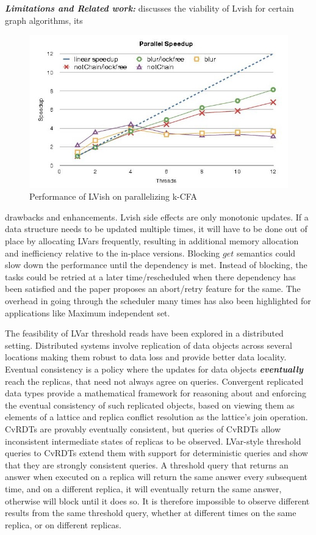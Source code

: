 \documentclass[twocolumn]{article}
\begin{document}
\textbf{\textit{Limitations and Related work:}} \cite{newton1}discusses the viability of Lvish for certain graph algorithms, its
\begin{figure}
\centerline{
\includegraphics[width=1.0\columnwidth]{Figures/speedup.jpg}
}
\caption{Performance of LVish on parallelizing k-CFA\cite{lkuper2}}
\label{Figure2}
\end{figure}
drawbacks and enhancements. Lvish side effects are only monotonic updates. If a data structure needs to be updated multiple times, it will have to be done out of place by allocating LVars frequently, resulting in additional memory allocation and inefficiency relative to the in-place versions. Blocking $get$ semantics could slow down the performance until the dependency is met. Instead of blocking, the tasks could be retried at a later time/rescheduled when there dependency has been satisfied and the paper proposes an abort/retry feature for the same. The overhead in going through the scheduler many times has also been highlighted for applications like Maximum independent set.\\ \par
The feasibility of LVar threshold reads have been explored in a distributed setting\cite{newton2}. Distributed systems involve replication of data objects across several locations making them robust to data loss and provide better data locality. Eventual consistency is a policy where the updates for data objects \textbf{\textit{eventually}} reach the replicas, that need not always agree on queries. Convergent replicated data types provide a mathematical framework for reasoning about and enforcing the eventual consistency of such replicated objects, based on viewing them as elements of a lattice and replica conflict resolution as the lattice's join operation. CvRDTs are provably eventually consistent, but queries of CvRDTs allow inconsistent intermediate states of replicas to be observed. LVar-style threshold queries to CvRDTs extend them with support for deterministic queries and show that they are strongly consistent queries. A threshold query that returns an answer when executed on a replica will return the same answer every subsequent time, and on a different replica, it will eventually return the same answer, otherwise will block until it does so. It is therefore impossible to observe different results from the same threshold query, whether at different times on the same replica, or on different replicas.  
\end{document}

